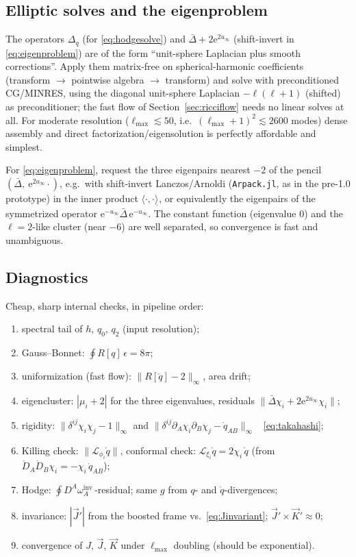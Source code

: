 \documentclass[11pt]{article}
\newcommand{\ee}{\mathrm{e}}
\newcommand{\Lie}{\mathcal{L}}
\newcommand{\qo}{\mathring{q}}          %
\newcommand{\Do}{\mathring{D}}          %
\newcommand{\vJ}{\vec{J}}
\newcommand{\vK}{\vec{K}}
\begin{document}
\subsection{Elliptic solves and the eigenproblem}

The operators $\Delta_q$ (for \eqref{eq:hodgesolve}) and $\bar\Delta + 2
\ee^{2u_\infty}$ (shift-invert in \eqref{eq:eigenproblem}) are of the
form ``unit-sphere Laplacian plus smooth corrections''.  Apply them
matrix-free on spherical-harmonic coefficients (transform $\to$ pointwise
algebra $\to$ transform) and solve with preconditioned CG/MINRES, using the
diagonal unit-sphere Laplacian $-\ell(\ell+1)$ (shifted) as preconditioner;
the fast flow of Section~\ref{sec:ricciflow} needs no linear solves at all.
For moderate resolution ($\ell_{\max}\lesssim 50$, i.e.\
$(\ell_{\max}+1)^2 \lesssim 2600$ modes) dense assembly and direct
factorization/eigensolution is perfectly affordable and simplest.

For \eqref{eq:eigenproblem}, request the three eigenpairs nearest $-2$ of
the pencil $(\bar\Delta,\ \ee^{2u_\infty}\!\cdot)$, e.g.\ with shift-invert
Lanczos/Arnoldi (\texttt{Arpack.jl}, as in the pre-1.0 prototype) in the
inner product $\langle\cdot,\cdot\rangle_{\mathring{}}$, or equivalently the
eigenpairs of the symmetrized operator
$\ee^{-u_\infty}\bar\Delta\,\ee^{-u_\infty}$.  The constant function
(eigenvalue $0$) and the $\ell=2$-like cluster (near $-6$) are well
separated, so convergence is fast and unambiguous.

\subsection{Diagnostics}

Cheap, sharp internal checks, in pipeline order:
\begin{enumerate}
\item spectral tail of $h$, $q_0$, $q_2$ (input resolution);
\item Gauss--Bonnet: $\oint R[q]\,\epsilon = 8\pi$;
\item uniformization (fast flow): $\lVert R[\qo]-2\rVert_\infty$, area drift;
\item eigencluster: $|\mu_i + 2|$ for the three eigenvalues, residuals
  $\lVert\bar\Delta\chi_i + 2\ee^{2u_\infty}\chi_i\rVert$;
\item rigidity: $\lVert \delta^{ij}\chi_i\chi_j - 1\rVert_\infty$ and
  $\lVert \delta^{ij}\partial_A\chi_i\partial_B\chi_j -
  \qo_{AB}\rVert_\infty$ \ \eqref{eq:takahashi};
\item Killing check: $\lVert \Lie_{\phi_i}\qo \rVert$, conformal check:
  $\Lie_{\xi_i}\qo = 2\chi_i\,\qo$ (from
  $\Do_A\Do_B\chi_i = -\chi_i\,\qo_{AB}$);
\item Hodge: $\oint D^A\omega^{\mathrm{inv}}_A\,$-residual; same $g$ from
  $q$- and $\qo$-divergences;
\item invariance: $|\vJ'|$ from the boosted frame vs.\
  \eqref{eq:Jinvariant}; $\vJ'\times\vK'\approx 0$;
\item convergence of $J$, $\vJ$, $\vK$ under $\ell_{\max}$ doubling
  (should be exponential).
\end{enumerate}
\end{document}
